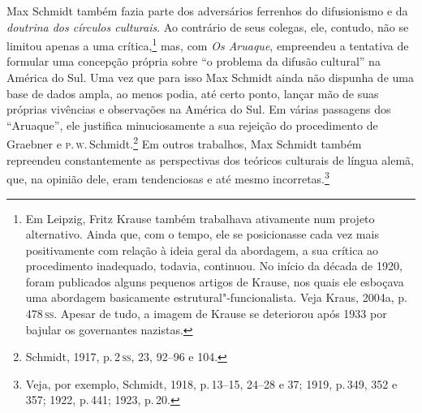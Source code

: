Max Schmidt também fazia parte dos adversários ferrenhos do
difusionismo e da \textit{doutrina dos círculos culturais}. Ao contrário de seus
colegas, ele, contudo, não se limitou apenas a uma crítica,\footnote{Em
  Leipzig, Fritz Krause também trabalhava ativamente num projeto
  alternativo. Ainda que, com o tempo, ele se posicionasse cada vez mais
  positivamente com relação à ideia geral da abordagem, a sua crítica ao
  procedimento inadequado, todavia, continuou. No início da década de
  1920, foram publicados alguns pequenos artigos de Krause, nos quais
  ele esboçava uma abordagem basicamente estrutural"-funcionalista. Veja
  Kraus, 2004a, p.\,478\,\textsc{ss}. Apesar de tudo, a imagem de Krause se
  deteriorou após 1933 por bajular os governantes nazistas.} mas, com
\textit{Os Aruaque}, empreendeu a tentativa de formular uma concepção
própria sobre ``o problema da difusão cultural'' na América do Sul. Uma
vez que para isso Max Schmidt ainda não dispunha de uma base de dados
ampla, ao menos podia, até certo ponto, lançar mão de suas próprias
vivências e observações na América do Sul. Em várias passagens dos
``Aruaque'', ele justifica minuciosamente a sua rejeição do
procedimento de Graebner e \textsc{p}.\,\textsc{w}.\,Schmidt.\footnote{Schmidt, 1917, p.\,2\,\textsc{ss}, 
23, 92--96 e 104.} Em %
outros trabalhos, Max Schmidt também repreendeu constantemente as
perspectivas dos teóricos culturais de língua alemã, que, na opinião
dele, eram tendenciosas e até mesmo incorretas.\footnote{Veja, por
  exemplo, Schmidt, 1918, p.\,13--15, 24--28 e 37; 1919, p.\,349, 352 e 357;
  1922, p.\,441; 1923, p.\,20.}

